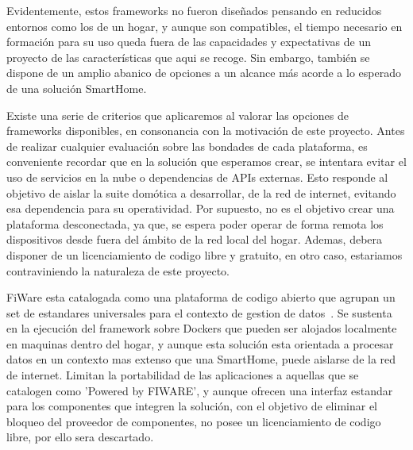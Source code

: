 Evidentemente, estos frameworks no fueron diseñados pensando en reducidos entornos como los de un hogar, y aunque son compatibles, el tiempo necesario en formación para su uso queda fuera de las capacidades y expectativas de un proyecto de las características que aqui se recoge. Sin embargo, también se dispone de un amplio abanico de opciones a un alcance más acorde a lo esperado de una solución SmartHome.

Existe una serie de criterios que aplicaremos al valorar las opciones de frameworks disponibles, en consonancia con la motivación de este proyecto. Antes de realizar cualquier evaluación sobre las bondades de cada plataforma, es conveniente recordar que en la solución que esperamos crear, se intentara evitar el uso de servicios en la nube o dependencias de APIs externas. Esto responde al objetivo de aislar la suite domótica a desarrollar, de la red de internet, evitando esa dependencia para su operatividad. Por supuesto, no es el objetivo crear una plataforma desconectada, ya que, se espera poder operar de forma remota los dispositivos desde fuera del ámbito de la red local del hogar. Ademas, debera disponer de un licenciamiento de codigo libre y gratuito, en otro caso, estariamos contraviniendo la naturaleza de este proyecto.

FiWare esta catalogada como una plataforma de codigo abierto que agrupan un set de estandares universales para el contexto de gestion de datos~\cite{whatisfiware}. Se sustenta en la ejecución del framework sobre Dockers que pueden ser alojados localmente en maquinas dentro del hogar, y aunque esta solución esta orientada a procesar datos en un contexto mas extenso que una SmartHome, puede aislarse de la red de internet. Limitan la portabilidad de las aplicaciones a aquellas que se catalogen como 'Powered by FIWARE', y aunque ofrecen una interfaz estandar para los componentes que integren la solución, con el objetivo de eliminar el bloqueo del proveedor de componentes, no posee un licenciamiento de codigo libre, por ello sera descartado.

